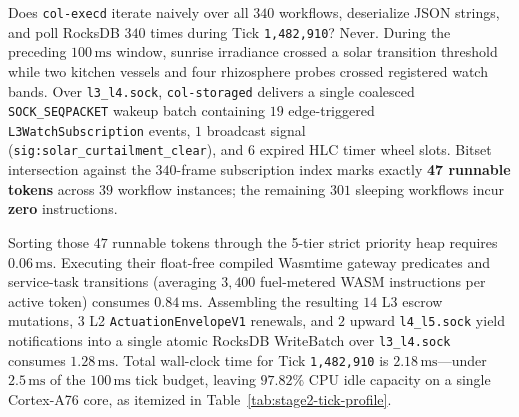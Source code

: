 Does \texttt{col-execd} iterate naively over all $340$ workflows, deserialize JSON strings, and poll
RocksDB $340$ times during Tick \texttt{1,482,910}? Never. During the preceding $100\,\mathrm{ms}$ window,
sunrise irradiance crossed a solar transition threshold while two kitchen vessels and four rhizosphere
probes crossed registered watch bands. Over \texttt{l3\_l4.sock}, \texttt{col-storaged} delivers a single
coalesced \texttt{SOCK\_SEQPACKET} wakeup batch containing $19$ edge-triggered
\texttt{L3WatchSubscription} events, $1$ broadcast signal (\texttt{sig:solar\_curtailment\_clear}), and
$6$ expired HLC timer wheel slots. Bitset intersection against the $340$-frame subscription index marks
exactly \textbf{47 runnable tokens} across $39$ workflow instances; the remaining $301$ sleeping workflows
incur \textbf{zero} instructions.

Sorting those $47$ runnable tokens through the 5-tier strict priority heap requires $0.06\,\mathrm{ms}$.
Executing their float-free compiled Wasmtime gateway predicates and service-task transitions (averaging
$3{,}400$ fuel-metered WASM instructions per active token) consumes $0.84\,\mathrm{ms}$. Assembling the
resulting $14$ L3 escrow mutations, $3$ L2 \texttt{ActuationEnvelopeV1} renewals, and $2$ upward
\texttt{l4\_l5.sock} yield notifications into a single atomic RocksDB WriteBatch over \texttt{l3\_l4.sock}
consumes $1.28\,\mathrm{ms}$. Total wall-clock time for Tick \texttt{1,482,910} is
\textbf{$2.18\,\mathrm{ms}$}---under $2.5\,\mathrm{ms}$ of the $100\,\mathrm{ms}$ tick budget, leaving
$97.82\%$ CPU idle capacity on a single Cortex-A76 core, as itemized in
Table~\ref{tab:stage2-tick-profile}.

